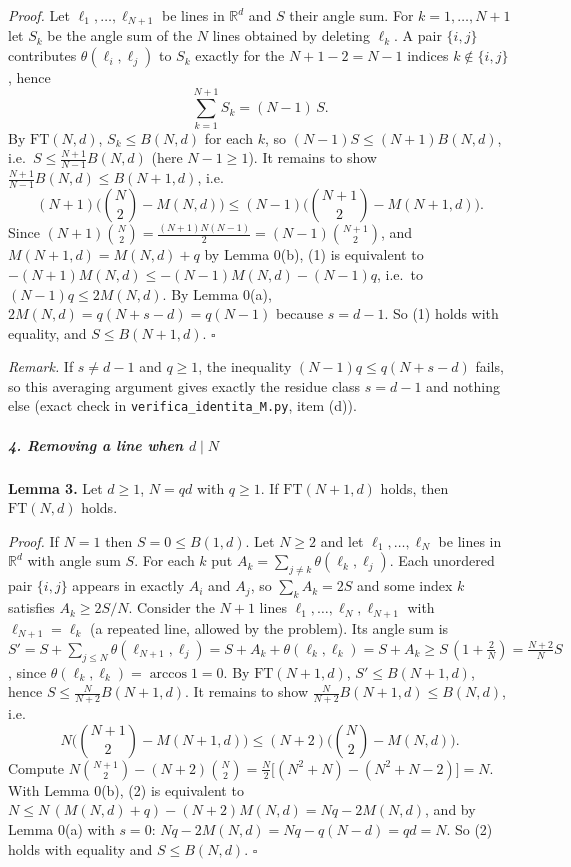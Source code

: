 \emph{Proof.} Let \(\ell_1,\dots,\ell_{N+1}\) be lines in
\(\mathbb R^d\) and \(S\) their angle sum. For \(k=1,\dots,N+1\) let
\(S_k\) be the angle sum of the \(N\) lines obtained by deleting
\(\ell_k\). A pair \(\{i,j\}\) contributes \(\theta(\ell_i,\ell_j)\) to
\(S_k\) exactly for the \(N+1-2=N-1\) indices \(k\notin\{i,j\}\), hence
\[\sum_{k=1}^{N+1}S_k=(N-1)\,S.\] By \(\mathrm{FT}(N,d)\),
\(S_k\le B(N,d)\) for each \(k\), so \((N-1)S\le(N+1)B(N,d)\),
i.e.~\(S\le\frac{N+1}{N-1}B(N,d)\) (here \(N-1\ge1\)). It remains to
show \(\frac{N+1}{N-1}B(N,d)\le B(N+1,d)\), i.e.
\[(N+1)\Big(\binom N2-M(N,d)\Big)\le(N-1)\Big(\binom{N+1}2-M(N+1,d)\Big).\tag{1}\]
Since \((N+1)\binom N2=\frac{(N+1)N(N-1)}2=(N-1)\binom{N+1}2\), and
\(M(N+1,d)=M(N,d)+q\) by Lemma 0(b), (1) is equivalent to
\(-(N+1)M(N,d)\le-(N-1)M(N,d)-(N-1)q\), i.e.~to \((N-1)q\le2M(N,d)\). By
Lemma 0(a), \(2M(N,d)=q(N+s-d)=q(N-1)\) because \(s=d-1\). So (1) holds
with equality, and \(S\le B(N+1,d)\). \(\square\)

\emph{Remark.} If \(s\ne d-1\) and \(q\ge1\), the inequality
\((N-1)q\le q(N+s-d)\) fails, so this averaging argument gives exactly
the residue class \(s=d-1\) and nothing else (exact check in
\texttt{verifica\_identita\_M.py}, item (d)).

\subparagraph{\texorpdfstring{4. Removing a line when
\(d\mid N\)}{4. Removing a line when d\textbackslash mid N}}\label{removing-a-line-when-dmid-n}

\textbf{Lemma 3.} Let \(d\ge1\), \(N=qd\) with \(q\ge1\). If
\(\mathrm{FT}(N+1,d)\) holds, then \(\mathrm{FT}(N,d)\) holds.

\emph{Proof.} If \(N=1\) then \(S=0\le B(1,d)\). Let \(N\ge2\) and let
\(\ell_1,\dots,\ell_N\) be lines in \(\mathbb R^d\) with angle sum
\(S\). For each \(k\) put \(A_k=\sum_{j\ne k}\theta(\ell_k,\ell_j)\).
Each unordered pair \(\{i,j\}\) appears in exactly \(A_i\) and \(A_j\),
so \(\sum_kA_k=2S\) and some index \(k\) satisfies \(A_k\ge2S/N\).
Consider the \(N+1\) lines \(\ell_1,\dots,\ell_N,\ell_{N+1}\) with
\(\ell_{N+1}=\ell_k\) (a repeated line, allowed by the problem). Its
angle sum is
\(S'=S+\sum_{j\le N}\theta(\ell_{N+1},\ell_j)=S+A_k+\theta(\ell_k,\ell_k)=S+A_k\ge S\,(1+\tfrac2N)=\tfrac{N+2}{N}S\),
since \(\theta(\ell_k,\ell_k)=\arccos1=0\). By \(\mathrm{FT}(N+1,d)\),
\(S'\le B(N+1,d)\), hence \(S\le\frac{N}{N+2}B(N+1,d)\). It remains to
show \(\frac N{N+2}B(N+1,d)\le B(N,d)\), i.e.
\[N\Big(\binom{N+1}2-M(N+1,d)\Big)\le(N+2)\Big(\binom N2-M(N,d)\Big).\tag{2}\]
Compute
\(N\binom{N+1}2-(N+2)\binom N2=\frac{N}{2}\big[(N^2+N)-(N^2+N-2)\big]=N\).
With Lemma 0(b), (2) is equivalent to
\(N\le N\,(M(N,d)+q)-(N+2)M(N,d)=Nq-2M(N,d)\), and by Lemma 0(a) with
\(s=0\): \(Nq-2M(N,d)=Nq-q(N-d)=qd=N\). So (2) holds with equality and
\(S\le B(N,d)\). \(\square\)

